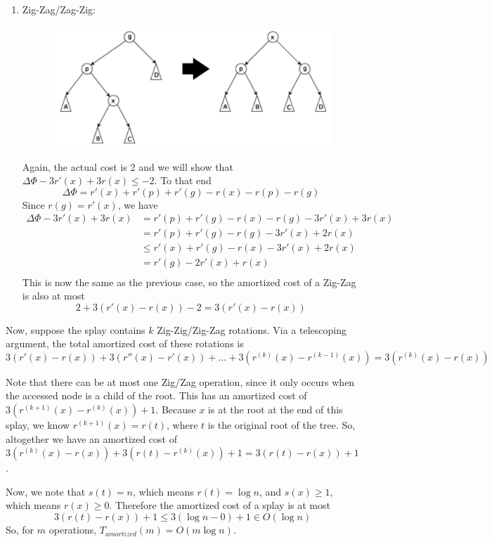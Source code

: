 \documentclass[12pt]{article}
\begin{document}
\begin{enumerate}
  \item Zig-Zag/Zag-Zig:
  \begin{figure}[!ht]
    \centering
    \includegraphics[scale=0.33]{pics/splay_tree/zig_zag2}
  \end{figure}

  Again, the actual cost is 2 and we will show that $\Delta\Phi - 3r'(x) + 3r(x) \leq -2$. To that end
  \[ \Delta\Phi = r'(x) + r'(p)+ r'(g) - r(x) - r(p) - r(g) \]
  Since $r(g) = r'(x)$, we have
  \begin{align*}
    \Delta\Phi - 3r'(x) + 3r(x) &= r'(p) + r'(g) - r(x) - r(g) - 3r'(x) + 3r(x) \\
    &= r'(p) + r'(g) - r(g) - 3r'(x) + 2r(x) \\
    &\leq r'(x) + r'(g) - r(x) - 3r'(x) + 2r(x) \\
    &= r'(g) - 2r'(x) + r(x) \\
  \end{align*}
  This is now the same as the previous case, so the amortized cost of a Zig-Zag is also at most
  \[ 2 + 3(r'(x) - r(x)) - 2 = 3(r'(x) - r(x)) \]
\end{enumerate}

Now, suppose the splay contains  $k$ Zig-Zig/Zig-Zag rotations. Via a telescoping argument, the total amortized cost of these rotations is
\[ 3(r'(x) - r(x)) + 3(r''(x) - r'(x)) + \ldots + 3(r^{(k)}(x) - r^{(k-1)}(x)) = 3(r^{(k)}(x) - r(x)) \]

Note that there can be at most one Zig/Zag operation, since it only occurs when the accessed node is a child of the root. This has an amortized cost of $3(r^{(k+1)}(x) - r^{(k)}(x)) + 1$. Because $x$ is at the root at the end of this splay, we know $r^{(k+1)}(x) = r(t)$, where $t$ is the original root of the tree. So, altogether we have an amortized cost of $3(r^{(k)}(x) - r(x)) + 3(r(t) - r^{(k)}(x)) + 1 = 3(r(t) - r(x)) + 1$.

Now, we note that $s(t) = n$, which means $r(t) = \log n$, and $s(x) \geq 1$, which means $r(x) \geq 0$. Therefore the amortized cost of a splay is at most
\[ 3(r(t) - r(x)) + 1 \leq 3(\log n - 0) + 1 \in O(\log n)\]
So, for $m$ operations, $T_{amortized}(m) = O(m \log n)$.
\end{document}
